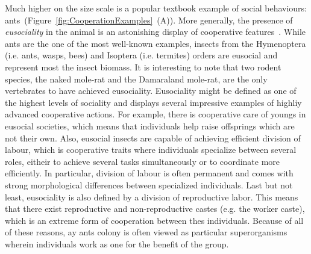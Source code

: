     Much higher on the size scale is a popular textbook example of social behaviours: ants~(Figure~\ref{fig:CooperationExamples}~(A)). More generally, the presence of \emph{eusociality} in the animal is an astonishing display of cooperative features~\parencite{Wilson1990}. While ants are the one of the most well-known examples, insects from the Hymenoptera (i.e. ants, wasps, bees) and Isoptera (i.e. termites) orders are eusocial and represent most the insect biomass\parencite{Wilson2008}. It is interesting to note that two rodent species, the naked mole-rat and the Damaraland mole-rat, are the only vertebrates to have achieved eusociality. Eusociality might be defined as one of the highest levels of sociality and displays several impressive examples of highliy advanced cooperative actions. For example, there is cooperative care of youngs in eusocial societies, which means that individuals help raise offsprings which are not their own. Also, eusocial insects are capable of achieving efficient division of labour, which is cooperative traits where individuals specialize between several roles, eitheir to achieve several tasks simultaneously or to coordinate more efficiently. In particular, division of labour is often permanent and comes with strong morphological differences between specialized individuals. Last but not least, eusociality is also defined by a division of reproductive labor. This means that there exist reproductive and non-reproductive castes (e.g. the worker caste), which is an extreme form of cooperation between thes individuals. Because of all of these reasons, ay ants colony is often viewed as particular superorganisms wherein individuals work as one for the benefit of the group.

